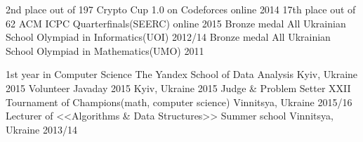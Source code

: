 






\begin{cvhonors}
  \cvhonor
    {2nd place out of 197}
    {Crypto Cup 1.0 on Codeforces}
    {online}
    {2014}
  \cvhonor
    {17th place out of 62}
    {ACM ICPC Quarterfinals(SEERC)}
    {online}
    {2015}
  \cvhonor
    {Bronze medal}
    {All Ukrainian School Olympiad in Informatics(UOI)}
    {}
    {2012/14}
  \cvhonor
    {Bronze medal}
    {All Ukrainian School Olympiad in Mathematics(UMO)}
    {}
    {2011}
\end{cvhonors}

\begin{cvhonors}
  \cvhonor
    {1st year in Computer Science}
    {The Yandex School of Data Analysis}
    {Kyiv, Ukraine}
    {2015}
  \cvhonor
    {Volunteer}
    {Javaday 2015}
    {Kyiv, Ukraine}
    {2015}
  \cvhonor
    {Judge \& Problem Setter}
    {XXII Tournament of Champions(math, computer science)}
    {Vinnitsya, Ukraine}
    {2015/16}
  \cvhonor
    {Lecturer of <<Algorithms \& Data Structures>>}
    {Summer school}
    {Vinnitsya, Ukraine}
    {2013/14}
\end{cvhonors}